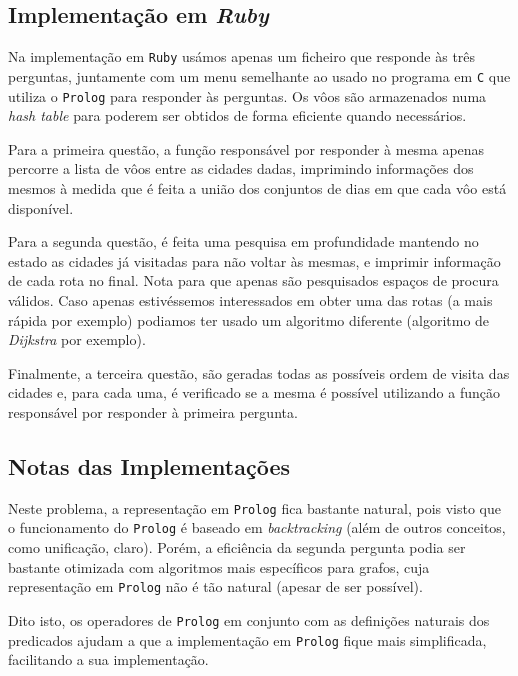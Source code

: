 \documentclass[12pt,a4paper,oneside]{article}
\begin{document}
\subsection{Implementação em \textit{Ruby}}

Na implementação em \texttt{Ruby} usámos apenas um ficheiro que
responde às três perguntas, juntamente com um menu semelhante ao usado
no programa em \texttt{C} que utiliza o \texttt{Prolog} para responder
às perguntas. Os vôos são armazenados numa \textit{hash table} para
poderem ser obtidos de forma eficiente quando necessários.

Para a primeira questão, a função responsável por responder à mesma
apenas percorre a lista de vôos entre as cidades dadas, imprimindo
informações dos mesmos à medida que é feita a união dos conjuntos de
dias em que cada vôo está disponível.

Para a segunda questão, é feita uma pesquisa em profundidade mantendo
no estado as cidades já visitadas para não voltar às mesmas, e imprimir
informação de cada rota no final. Nota para que apenas são pesquisados
espaços de procura válidos. Caso apenas estivéssemos interessados em
obter uma das rotas (a mais rápida por exemplo) podiamos ter usado um
algoritmo diferente (algoritmo de \textit{Dijkstra} por exemplo).

Finalmente, a terceira questão, são geradas todas as possíveis ordem de
visita das cidades e, para cada uma, é verificado se a mesma é possível
utilizando a função responsável por responder à primeira pergunta.

\subsection{Notas das Implementações}

Neste problema, a representação em \texttt{Prolog} fica bastante
natural, pois visto que o funcionamento do \texttt{Prolog} é baseado
em \textit{backtracking} (além de outros conceitos, como unificação,
claro). Porém, a eficiência da segunda pergunta podia ser bastante
otimizada com algoritmos mais específicos para grafos, cuja
representação em \texttt{Prolog} não é tão natural (apesar de ser
possível).

Dito isto, os operadores de \texttt{Prolog} em conjunto com as
definições naturais dos predicados ajudam a que a implementação em
\texttt{Prolog} fique mais simplificada, facilitando a sua
implementação.

\end{document}

